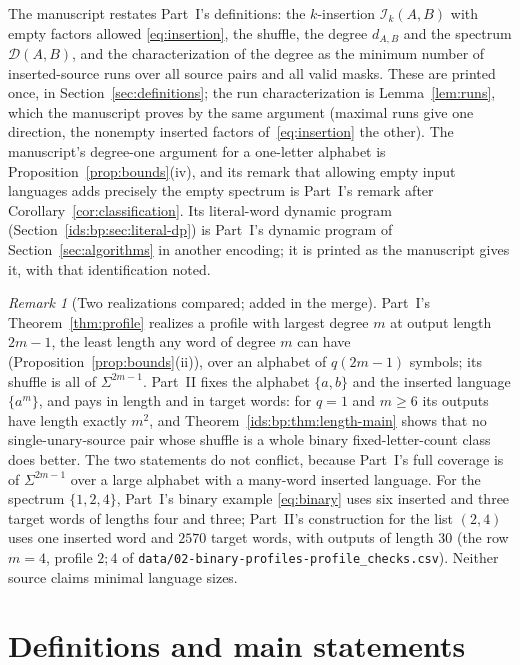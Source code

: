 \documentclass[11pt,letterpaper]{article}
\theoremstyle{definition}\newtheorem{definition}[theorem]{Definition}
\theoremstyle{remark}\newtheorem{remark}[theorem]{Remark}
\theoremstyle{definition}\newtheorem{question}[theorem]{Question}
\newcommand{\ins}[3]{\mathcal I_{#1}(#2,#3)}
\newcommand{\spec}[2]{\mathcal D(#1,#2)}
\begin{document}
The manuscript restates Part~I's definitions: the $k$-insertion
$\ins{k}{A}{B}$ with empty factors allowed \eqref{eq:insertion}, the shuffle,
the degree $d_{A,B}$ and the spectrum $\spec{A}{B}$, and the characterization
of the degree as the minimum number of inserted-source runs over all source
pairs and all valid masks. These are printed once, in
Section~\ref{sec:definitions}; the run characterization is
Lemma~\ref{lem:runs}, which the manuscript proves by the same argument
(maximal runs give one direction, the nonempty inserted factors
of~\eqref{eq:insertion} the other). The manuscript's degree-one argument for
a one-letter alphabet is Proposition~\ref{prop:bounds}(iv), and its remark
that allowing empty input languages adds precisely the empty spectrum is
Part~I's remark after Corollary~\ref{cor:classification}. Its literal-word
dynamic program (Section~\ref{ids:bp:sec:literal-dp}) is Part~I's dynamic
program of Section~\ref{sec:algorithms} in another encoding; it is printed as
the manuscript gives it, with that identification noted.

\begin{remark}[Two realizations compared; added in the merge]\label{ids:bp:rem:compare}
Part~I's Theorem~\ref{thm:profile} realizes a profile with largest degree $m$
at output length $2m-1$, the least length any word of degree $m$ can have
(Proposition~\ref{prop:bounds}(ii)), over an alphabet of $q(2m-1)$ symbols;
its shuffle is all of $\Sigma^{2m-1}$. Part~II fixes the alphabet
$\{a,b\}$ and the inserted language $\{a^m\}$, and pays in length and in
target words: for $q=1$ and $m\geq6$ its outputs have length exactly $m^2$,
and Theorem~\ref{ids:bp:thm:length-main} shows that no single-unary-source
pair whose shuffle is a whole binary fixed-letter-count class does better. The
two statements do not conflict, because Part~I's full coverage is of
$\Sigma^{2m-1}$ over a large alphabet with a many-word inserted language. For
the spectrum $\{1,2,4\}$, Part~I's binary example \eqref{eq:binary} uses six
inserted and three target words of lengths four and three; Part~II's
construction for the list $(2,4)$ uses one inserted word and $2570$ target
words, with outputs of length $30$ (the row $m=4$, profile $2;4$ of
\nolinkurl{data/02-binary-profiles-profile_checks.csv}). Neither source claims
minimal language sizes.
\end{remark}

\section{Definitions and main statements}\label{ids:bp:sec:main}
\end{document}
